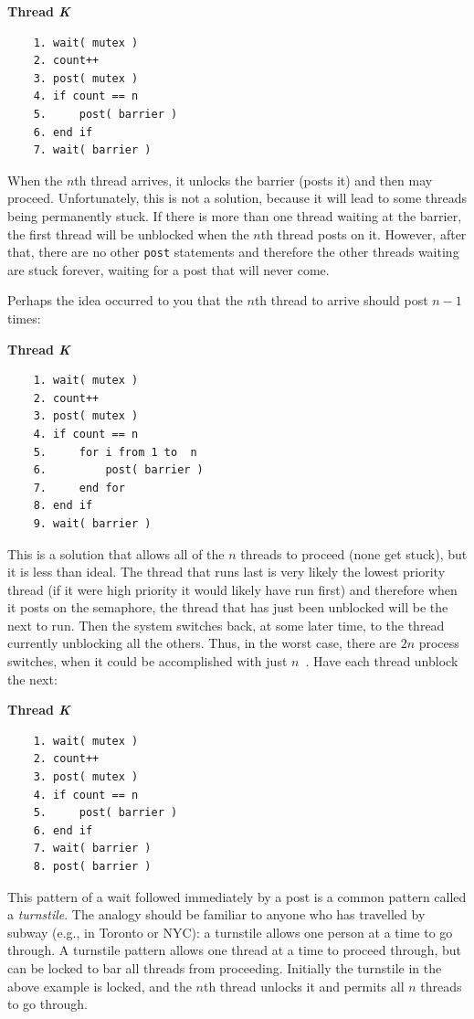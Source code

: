 \textbf{Thread \textit{K}}\vspace{-2em}
\begin{verbatim}
	1. wait( mutex )
	2. count++
	3. post( mutex )
	4. if count == n
	5.     post( barrier )
	6. end if
	7. wait( barrier )
  \end{verbatim}
\vspace{-2em}

When the $n$th thread arrives, it unlocks the barrier (posts it) and then may proceed. Unfortunately, this is not a solution, because it will lead to some threads being permanently stuck. If there is more than one thread waiting at the barrier, the first thread will be unblocked when the $n$th thread posts on it. However, after that, there are no other \texttt{post} statements and therefore the other threads waiting are stuck forever, waiting for a post that will never come.

Perhaps the idea occurred to you that the $n$th thread to arrive should post $n-1$ times:

\textbf{Thread \textit{K}}\vspace{-2em}
\begin{verbatim}
	1. wait( mutex )
	2. count++
	3. post( mutex )
	4. if count == n
	5.     for i from 1 to  n
	6.         post( barrier )
	7.     end for
	8. end if
	9. wait( barrier )
  \end{verbatim}
\vspace{-2em}

This is a solution that allows all of the $n$ threads to proceed (none get stuck), but it is less than ideal. The thread that runs last is very likely the lowest priority thread (if it were high priority it would likely have run first) and therefore when it posts on the semaphore, the thread that has just been unblocked will be the next to run. Then the system switches back, at some later time, to the thread currently unblocking all the others. Thus, in the worst case, there are $2n$ process switches, when it could be accomplished with just $n$~\cite{mte241}. Have each thread unblock the next:

\textbf{Thread \textit{K}}\vspace{-2em}
\begin{verbatim}
	1. wait( mutex )
	2. count++
	3. post( mutex )
	4. if count == n
	5.     post( barrier )
	6. end if
	7. wait( barrier )
	8. post( barrier )
  \end{verbatim}
\vspace{-2em}

This pattern of a wait followed immediately by a post is a common pattern called a \textit{turnstile}. The analogy should be familiar to anyone who has travelled by subway (e.g., in Toronto or NYC): a turnstile allows one person at a time to go through. A turnstile pattern allows one thread at a time to proceed through, but can be locked to bar all threads from proceeding. Initially the turnstile in the above example is locked, and the $n$th thread unlocks it and permits all $n$ threads to go through.

